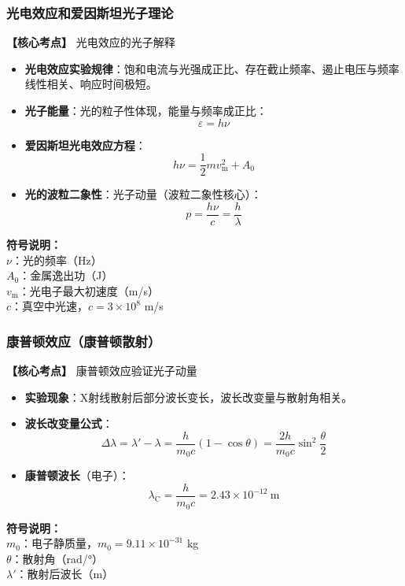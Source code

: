 \subsubsection{光电效应和爱因斯坦光子理论}
\textbf{【核心考点】} 光电效应的光子解释 \par\vspace{0.3em}
\begin{itemize}
    \item \textbf{光电效应实验规律}：饱和电流与光强成正比、存在截止频率、遏止电压与频率线性相关、响应时间极短。
    \item \textbf{光子能量}：光的粒子性体现，能量与频率成正比：
          \[
          \varepsilon = h\nu
          \]
    \item \textbf{爱因斯坦光电效应方程}：
          \[
          h\nu = \frac{1}{2}mv_{\text{m}}^2 + A_0
          \]
    \item \textbf{光的波粒二象性}：光子动量（波粒二象性核心）：
          \[
          p = \frac{h\nu}{c} = \frac{h}{\lambda}
          \]
\end{itemize}

\textbf{符号说明：}\\
$\nu$：光的频率（Hz） \\
$A_0$：金属逸出功（J） \\
$v_{\text{m}}$：光电子最大初速度（m/s） \\
$c$：真空中光速，$c=3\times10^8$ m/s
\vspace{0.5em}

\subsubsection{康普顿效应（康普顿散射）}
\textbf{【核心考点】} 康普顿效应验证光子动量 \par\vspace{0.3em}
\begin{itemize}
    \item \textbf{实验现象}：X射线散射后部分波长变长，波长改变量与散射角相关。
    \item \textbf{波长改变量公式}：
          \[
          \Delta\lambda = \lambda' - \lambda = \frac{h}{m_0 c}(1-\cos\theta) = \frac{2h}{m_0 c}\sin^2\frac{\theta}{2}
          \]
    \item \textbf{康普顿波长}（电子）：
          \[
          \lambda_{\text{C}} = \frac{h}{m_0 c} = 2.43\times10^{-12}\ \text{m}
          \]
\end{itemize}

\textbf{符号说明：}\\
$m_0$：电子静质量，$m_0=9.11\times10^{-31}$ kg \\
$\theta$：散射角（rad/°） \\
$\lambda'$：散射后波长（m）
\vspace{0.5em}

